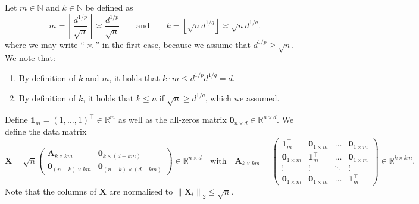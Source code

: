 \documentclass[a4paper]{article}
\newcommand{\norm}[1]{\left\|#1\right\|}
\newcommand{\floor}[1]{\left\lfloor #1 \right\rfloor}
\newcommand{\A}[0]{\mathbf{A}}
\newcommand{\X}[0]{\mathbf{X}}
\newcommand{\zeros}[0]{\mathbf{0}}
\newcommand{\NN}[0]{\mathbb{N}}
\newcommand{\RR}[0]{\mathbb{R}}
\newcommand{\ind}[0]{\mathbf{1}}
\theoremstyle{thmstyle}
\theoremstyle{defstyle}
\theoremstyle{remark}
\begin{document}
Let $m\in\NN$ and $k\in\NN$ be defined as
\begin{equation*}
    m = \floor{\frac{d^{1/p}}{\sqrt{n}} } \asymp\frac{d^{1/p}}{\sqrt{n}}\qquad \text{and} \qquad k = \floor{ \sqrt{n}d^{1/q}} \asymp \sqrt{n}d^{1/q}.
\end{equation*}
where we may write ``$\asymp$'' in the first case, because we assume that $ d^{1/p}\geq \sqrt{n}$.
We note that:
\begin{enumerate}
    \item By definition of $k$ and $m$, it holds that $k\cdot m \leq d^{1/p}d^{1/q}= d $.
    \item By definition of $k$, it holds that $k\leq n$ if $\sqrt{n}\geq d^{1/q}$, which we assumed. 
\end{enumerate}

Define $\ind_m = (1,\dots,1)^\top\in \RR^m$ as well as the all-zeros matrix $\zeros_{n\times d}\in\RR^{n\times d}$. We define the data matrix 
\begin{equation}
\label{eq:adversarial-matrix}
    \X=\sqrt{n}
    \begin{pmatrix}
        \A_{k\times km} & \zeros_{k\times(d-km)} \\
        \zeros_{(n-k)\times km} & \zeros_{(n-k)\times(d-km)}
    \end{pmatrix}
    \in\RR^{n\times d} \quad \text{with} \quad 
    \A_{k\times km}=
    \begin{pmatrix}
        \ind_m^\top & \zeros_{1\times m} & \hdots &\zeros_{1\times m}\\
        \zeros_{1\times m}  & \ind_m^\top & \hdots & \zeros_{1\times m}\\
        \vdots & \vdots & \ddots & \vdots \\
        \zeros_{1\times m} & \zeros_{1\times m} & \dots & \ind_m^\top
    \end{pmatrix}
    \in \RR^{k\times km}.
\end{equation}
Note that the columns of $\X$ are normalised to $\norm{\X_i}_2\leq \sqrt{n}$. 
\end{document}
